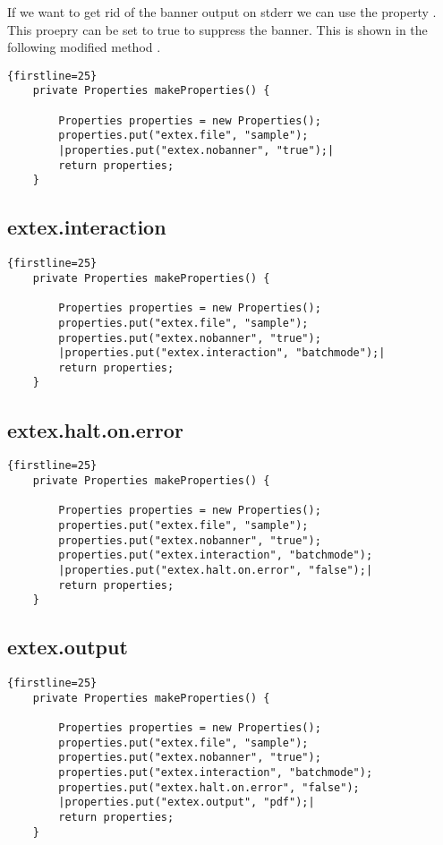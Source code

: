 If we want to get rid of the banner output on stderr we can use the
property . This proepry can be set to true to
suppress the banner. This is shown in the following modified method
.

\begin{lstlisting}{firstline=25}
    private Properties makeProperties() {

        Properties properties = new Properties();
        properties.put("extex.file", "sample");
        |properties.put("extex.nobanner", "true");|
        return properties;
    }
\end{lstlisting}

\subsection{extex.interaction}

\begin{lstlisting}{firstline=25}
    private Properties makeProperties() {

        Properties properties = new Properties();
        properties.put("extex.file", "sample");
        properties.put("extex.nobanner", "true");
        |properties.put("extex.interaction", "batchmode");|
        return properties;
    }
\end{lstlisting}

\subsection{extex.halt.on.error}

\begin{lstlisting}{firstline=25}
    private Properties makeProperties() {

        Properties properties = new Properties();
        properties.put("extex.file", "sample");
        properties.put("extex.nobanner", "true");
        properties.put("extex.interaction", "batchmode");
        |properties.put("extex.halt.on.error", "false");|
        return properties;
    }
\end{lstlisting}

\subsection{extex.output}

\begin{lstlisting}{firstline=25}
    private Properties makeProperties() {

        Properties properties = new Properties();
        properties.put("extex.file", "sample");
        properties.put("extex.nobanner", "true");
        properties.put("extex.interaction", "batchmode");
        properties.put("extex.halt.on.error", "false");
        |properties.put("extex.output", "pdf");|
        return properties;
    }
\end{lstlisting}

